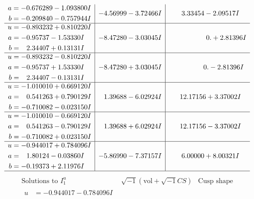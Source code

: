 \documentclass[1p]{elsarticle_modified}
\theoremstyle{definition}
\newcommand{\I}{\sqrt{-1}}
\begin{document}
$$\begin{array}{c|c|c}
\begin{aligned}
a &= -0.676289 - 1.093800 I \\
b &= -0.209840 - 0.757944 I\end{aligned}
 & -4.56999 - 3.72466 I & \phantom{-}3.33454 - 2.09517 I \\ \hline\begin{aligned}
u &= -0.893232 + 0.810220 I \\
a &= -0.95737 - 1.53330 I \\
b &= \phantom{-}2.34407 + 0.13131 I\end{aligned}
 & -8.47280 - 3.03045 I & \phantom{-0.000000 -}0. + 2.81396 I \\ \hline\begin{aligned}
u &= -0.893232 - 0.810220 I \\
a &= -0.95737 + 1.53330 I \\
b &= \phantom{-}2.34407 - 0.13131 I\end{aligned}
 & -8.47280 + 3.03045 I & \phantom{-0.000000 } 0. - 2.81396 I \\ \hline\begin{aligned}
u &= -1.010010 + 0.669120 I \\
a &= \phantom{-}0.541263 + 0.790129 I \\
b &= -0.710082 - 0.023150 I\end{aligned}
 & \phantom{-}1.39688 - 6.02924 I & \phantom{-}12.17156 + 3.37002 I \\ \hline\begin{aligned}
u &= -1.010010 - 0.669120 I \\
a &= \phantom{-}0.541263 - 0.790129 I \\
b &= -0.710082 + 0.023150 I\end{aligned}
 & \phantom{-}1.39688 + 6.02924 I & \phantom{-}12.17156 - 3.37002 I \\ \hline\begin{aligned}
u &= -0.944017 + 0.784096 I \\
a &= \phantom{-}1.80124 - 0.03860 I \\
b &= -0.19373 + 2.11976 I\end{aligned}
 & -5.86990 - 7.37157 I & \phantom{-}6.00000 + 8.00321 I\\
 \hline 
 \end{array}$$\newpage$$\begin{array}{c|c|c}  
\text{Solutions to }I^u_{1}& \I (\text{vol} + \sqrt{-1}CS) & \text{Cusp shape}\\
 \hline 
\begin{aligned}
u &= -0.944017 - 0.784096 I \\

\end{aligned}
\end{array}$$
\end{document}
